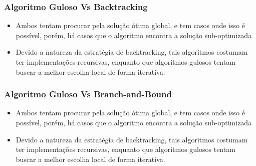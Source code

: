     \subsubsection{Algoritmo Guloso Vs Backtracking}

    \begin{itemize}
        \item Ambos tentam procurar pela solução ótima global, e tem casos
        onde isso é possível, porém, há casos que o algoritmo encontra a solução 
        sub-optimizada
        \item Devido a natureza da estratégia de backtracking, tais algoritmos costumam ter 
        implementações recursivas, enquanto que algoritmos gulosos tentam 
        buscar a melhor escolha local de forma iterativa.
    \end{itemize}

    \subsubsection{Algoritmo Guloso Vs Branch-and-Bound}

    \begin{itemize}
        \item Ambos tentam procurar pela solução ótima global, e tem casos
        onde isso é possível, porém, há casos que o algoritmo encontra a solução 
        sub-optimizada
        \item Devido a natureza da estratégia de backtracking, tais algoritmos costumam ter 
        implementações recursivas, enquanto que algoritmos gulosos tentam 
        buscar a melhor escolha local de forma iterativa.
    \end{itemize}

    \nocite{greedy-algorithm}

\newpage